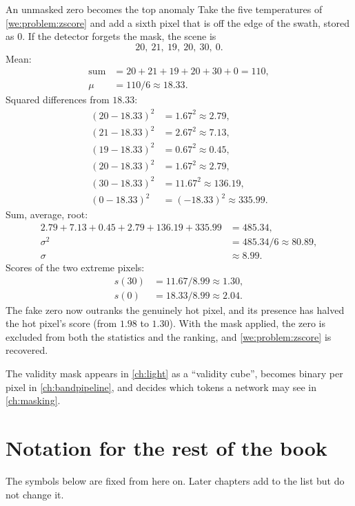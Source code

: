 \begin{worked}[label={we:problem:unmasked}]{An unmasked zero becomes the top anomaly}
Take the five temperatures of \cref{we:problem:zscore} and add a sixth pixel that is off the
edge of the swath, stored as $0$. If the detector forgets the mask, the scene is
\[ 20,\ 21,\ 19,\ 20,\ 30,\ 0. \]
Mean:
\begin{align*}
\text{sum} &= 20 + 21 + 19 + 20 + 30 + 0 = 110,\\
\mu &= 110/6 \approx 18.33.
\end{align*}
Squared differences from $18.33$:
\begin{align*}
(20 - 18.33)^2 &= 1.67^2 \approx 2.79,\\
(21 - 18.33)^2 &= 2.67^2 \approx 7.13,\\
(19 - 18.33)^2 &= 0.67^2 \approx 0.45,\\
(20 - 18.33)^2 &= 1.67^2 \approx 2.79,\\
(30 - 18.33)^2 &= 11.67^2 \approx 136.19,\\
(0 - 18.33)^2 &= (-18.33)^2 \approx 335.99.
\end{align*}
Sum, average, root:
\begin{align*}
2.79 + 7.13 + 0.45 + 2.79 + 136.19 + 335.99 &= 485.34,\\
\sigma^2 &= 485.34/6 \approx 80.89,\\
\sigma &\approx 8.99.
\end{align*}
Scores of the two extreme pixels:
\begin{align*}
s(30) &= 11.67/8.99 \approx 1.30,\\
s(0) &= 18.33/8.99 \approx 2.04.
\end{align*}
The fake zero now outranks the genuinely hot pixel, and its presence has halved the hot pixel's
score (from $1.98$ to $1.30$). With the mask applied, the zero is excluded from both the
statistics and the ranking, and \cref{we:problem:zscore} is recovered.
\end{worked}

The validity mask appears in \cref{ch:light} as a ``validity cube'', becomes binary per pixel in
\cref{ch:bandpipeline}, and decides which tokens a network may see in \cref{ch:masking}.

\section{Notation for the rest of the book}\label{sec:problem:notation}

The symbols below are fixed from here on. Later chapters add to the list but do not change it.

